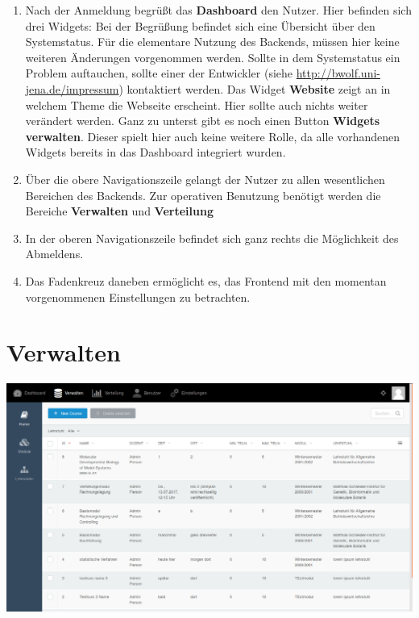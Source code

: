   \begin{enumerate}
   \item Nach der Anmeldung begrüßt das \textbf{Dashboard} den Nutzer. 
	  Hier befinden sich drei Widgets:\newline
	  Bei der Begrüßung befindet sich eine Übersicht über den Systemstatus.\newline
	  Für die elementare Nutzung des Backends, müssen hier keine weiteren Änderungen vorgenommen werden.\newline
	  Sollte in dem Systemstatus ein Problem auftauchen, sollte einer der Entwickler (siehe \url{http://bwolf.uni-jena.de/impressum}) 
	  kontaktiert werden.\newline
	  Das Widget \textbf{Website} zeigt an in welchem Theme die Webseite erscheint. Hier sollte auch nichts weiter verändert werden.
	  Ganz zu unterst gibt es noch einen Button \textbf{Widgets verwalten}. 
	  Dieser spielt hier auch keine weitere Rolle, da alle vorhandenen Widgets bereits in das Dashboard integriert wurden.
   \item Über die obere Navigationszeile gelangt der Nutzer zu allen wesentlichen Bereichen des Backends.
	 Zur operativen Benutzung benötigt werden die Bereiche \textbf{Verwalten} und \textbf{Verteilung}
   \item[] In der oberen Navigationszeile befindet sich ganz rechts die Möglichkeit des Abmeldens.
   \item[] Das Fadenkreuz daneben ermöglicht es, das Frontend mit den momentan vorgenommenen Einstellungen zu betrachten.
  \end{enumerate}

  
  \section{Verwalten}
  \label{section:manage}
  
    \includegraphics[scale=0.3]{backend/img/verwalten.png}

